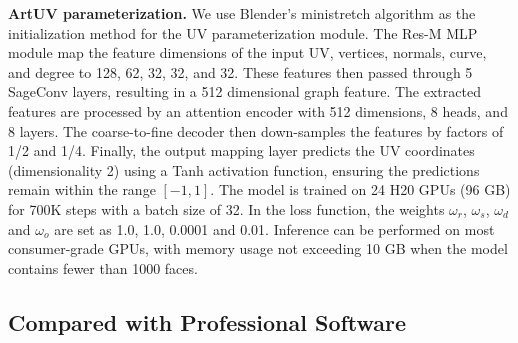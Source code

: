 \documentclass{article}
\begin{document}
\textbf{ArtUV parameterization.}
We use Blender's ministretch algorithm as the initialization method for the UV parameterization module. The Res-M MLP module map the feature dimensions of the input UV, vertices, normals, curve, and degree to 128, 62, 32, 32, and 32. These features then passed through 5 SageConv layers, resulting in a 512 dimensional graph feature. The extracted features are processed by an attention encoder with 512 dimensions, 8 heads, and 8 layers. The coarse-to-fine decoder then down-samples the features by factors of 1/2 and 1/4. Finally, the output mapping layer predicts the UV coordinates (dimensionality 2) using a Tanh activation function, ensuring the predictions remain within the range $\left [ -1,1 \right ]$.
The model is trained on 24 H20 GPUs (96 GB) for 700K steps with a batch size of 32. In the loss function, the weights $\omega_{r}$, $\omega_{s}$, $\omega_{d}$ and $\omega_{o}$ are set as 1.0, 1.0, 0.0001 and 0.01. Inference can be performed on most consumer-grade GPUs, with memory usage not exceeding 10 GB when the model contains fewer than 1000 faces.
\subsection{Compared with Professional Software}
\end{document}
